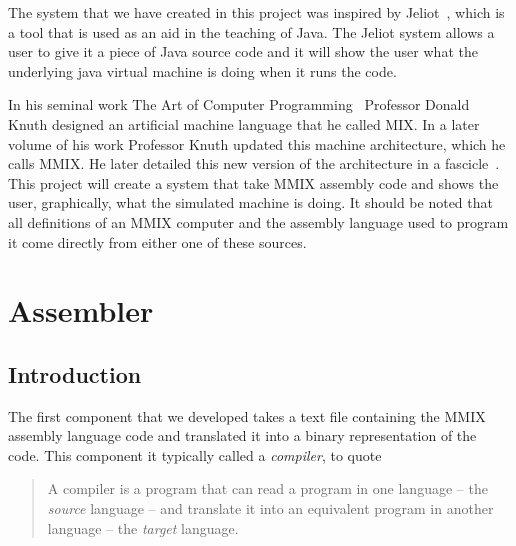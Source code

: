 \documentclass[a4paper,11pt]{report}
\begin{document}
The system that we have created in this project was inspired by Jeliot~\cite{jeliot:ref}, which is a tool that is used as an aid in the teaching of Java. The Jeliot system allows a user to give it a piece of Java source code and it will show the user what the underlying java virtual machine is doing when it runs the code.

In his seminal work The Art of Computer Programming~\cite{knuth:aocp1} Professor Donald Knuth designed an artificial machine language that he called MIX. In a later volume of his work Professor Knuth updated this machine architecture, which he calls MMIX. He later detailed this new version of the architecture in a fascicle~\cite{knuth:aocp2}. This project will create a system that take MMIX assembly code and shows the user, graphically, what the simulated machine is doing. It should be noted that all definitions of an MMIX computer and the assembly language used to program it come directly from either one of these sources.

\chapter{Assembler}
\label{c:assembler}
\section{Introduction}
The first component that we developed takes a text file containing the MMIX assembly language code and translated it into a binary representation of the code.  This component it typically called a \textit{compiler}, to quote \cite{dragon}

\begin{quote}
A compiler is a program that can read a program in one language -- the \textit{source} language -- and translate it into an equivalent program in another language -- the \textit{target} language.
\end{quote}
\end{document}
